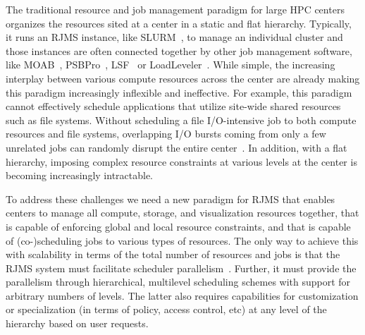 The traditional resource and job management paradigm
for large HPC centers organizes the resources sited
at a center in a static and flat hierarchy. Typically, it 
runs an RJMS instance, like SLURM~\cite{Jette02slurm}, to manage an individual cluster
and those instances are often connected together by 
other job management software, like MOAB~\cite{MOAB}, PSBPro~\cite{PSBPro}, LSF~\cite{LSF}
or LoadLeveler~\cite{LL}.
While simple, the increasing interplay 
between various compute resources across the center
are already making this paradigm increasingly 
inflexible and ineffective. 
For example, this paradigm cannot effectively
schedule applications that utilize site-wide shared 
resources such as file systems. 
Without scheduling a file I/O-intensive job 
to both compute resources and file systems, 
overlapping I/O bursts coming from only a few
unrelated jobs can randomly disrupt the entire center~\cite{SCR,SPINDLE}. 
In addition, with a flat hierarchy, imposing complex 
resource constraints at various levels at the center
is becoming increasingly intractable. 

To address these challenges we need 
a new paradigm for RJMS that enables centers to manage
all compute, storage, and visualization resources together, 
that is capable of enforcing global and local resource constraints,
and that
is capable of 
(co-)scheduling jobs to various types of resources.
The only way to achieve this with scalability in terms of the total number 
of resources and jobs is that the RJMS system must 
facilitate scheduler parallelism~\cite{Omega,Mesos}. Further, it must
provide the parallelism through hierarchical, multilevel 
scheduling schemes with support for arbitrary numbers of levels.
The latter also requires capabilities for customization or specialization (in terms
of policy, access control, etc) at any level of the hierarchy based on user requests.

